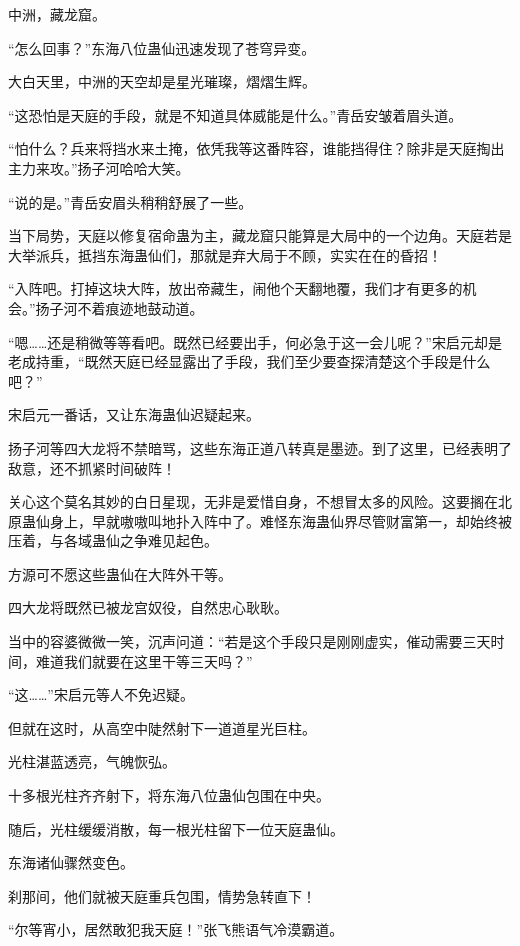 
\begin{this_body}

中洲，藏龙窟。

“怎么回事？”东海八位蛊仙迅速发现了苍穹异变。

大白天里，中洲的天空却是星光璀璨，熠熠生辉。

“这恐怕是天庭的手段，就是不知道具体威能是什么。”青岳安皱着眉头道。

“怕什么？兵来将挡水来土掩，依凭我等这番阵容，谁能挡得住？除非是天庭掏出主力来攻。”扬子河哈哈大笑。

“说的是。”青岳安眉头稍稍舒展了一些。

当下局势，天庭以修复宿命蛊为主，藏龙窟只能算是大局中的一个边角。天庭若是大举派兵，抵挡东海蛊仙们，那就是弃大局于不顾，实实在在的昏招！

“入阵吧。打掉这块大阵，放出帝藏生，闹他个天翻地覆，我们才有更多的机会。”扬子河不着痕迹地鼓动道。

“嗯……还是稍微等等看吧。既然已经要出手，何必急于这一会儿呢？”宋启元却是老成持重，“既然天庭已经显露出了手段，我们至少要查探清楚这个手段是什么吧？”

宋启元一番话，又让东海蛊仙迟疑起来。

扬子河等四大龙将不禁暗骂，这些东海正道八转真是墨迹。到了这里，已经表明了敌意，还不抓紧时间破阵！

关心这个莫名其妙的白日星现，无非是爱惜自身，不想冒太多的风险。这要搁在北原蛊仙身上，早就嗷嗷叫地扑入阵中了。难怪东海蛊仙界尽管财富第一，却始终被压着，与各域蛊仙之争难见起色。

方源可不愿这些蛊仙在大阵外干等。

四大龙将既然已被龙宫奴役，自然忠心耿耿。

当中的容婆微微一笑，沉声问道：“若是这个手段只是刚刚虚实，催动需要三天时间，难道我们就要在这里干等三天吗？”

“这……”宋启元等人不免迟疑。

但就在这时，从高空中陡然射下一道道星光巨柱。

光柱湛蓝透亮，气魄恢弘。

十多根光柱齐齐射下，将东海八位蛊仙包围在中央。

随后，光柱缓缓消散，每一根光柱留下一位天庭蛊仙。

东海诸仙骤然变色。

刹那间，他们就被天庭重兵包围，情势急转直下！

“尔等宵小，居然敢犯我天庭！”张飞熊语气冷漠霸道。


\end{this_body}
